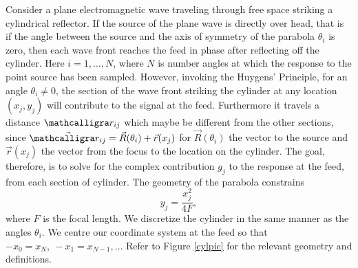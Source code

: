 Consider a plane electromagnetic wave traveling through free space striking a cylindrical reflector. If the source of the plane wave is directly over head, that is if the angle between the source and the axis of symmetry of the parabola $\theta_i$ is zero, then each wave front reaches the feed in phase after reflecting off the cylinder. Here $i=1,\dots,N$, where $N$ is number angles at which the response to the point source has been sampled. However, invoking the Huygens' Principle, for an angle $\theta_i\neq 0 $, the section of the wave front striking the cylinder at any location $(x_j, y_j)$ will contribute to the signal at the feed. Furthermore it travels a distance $\scripty{r}_{ij}$ which maybe be different from the other sections, since $\vec{\scripty{r}_{ij}} = \vec{R}(\theta_i) + \vec{r}(x_j)$ for $\vec{R}(\theta_i)$ the vector to the source and $\vec{r}(x_j)$ the vector from the focus to the location on the cylinder. The goal, therefore, is to solve for the complex contribution $g_j$ to the response at the feed, from each section of cylinder. The geometry of the parabola constrains
\begin{equation}
y_j = \frac{x_j^2}{4F},
\end{equation}
where $F$ is the focal length. We discretize the cylinder in the same manner as the angles $\theta_i$. We centre our coordinate system at the feed so that $-x_0 = x_N,~-x_1=x_{N-1},\dots$ Refer to Figure \ref{cylpic} for the relevant geometry and definitions.

